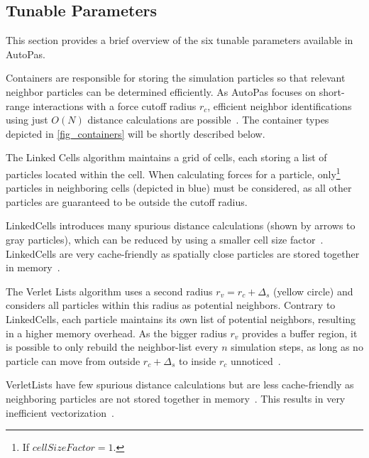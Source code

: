 \documentclass[conference]{IEEEtran}
\begin{document}
\subsection{Tunable Parameters}

This section provides a brief overview of the six tunable parameters available in AutoPas.

\begin{description}[style=nextline]
    \item[Container]
        Containers are responsible for storing the simulation particles so that relevant neighbor particles can be determined efficiently. As AutoPas focuses on short-range interactions with a force cutoff radius $r_c$, efficient neighbor identifications using just $O(N)$ distance calculations are possible~\cite{Gratl2019AutoPas}. The container types depicted in \autoref{fig_containers} will be shortly described below.

        \begin{description}[style=nextline, font=\itshape]
            \item[$\bullet$ Linked Cells]
                The Linked Cells algorithm maintains a grid of cells, each storing a list of particles located within the cell. When calculating forces for a particle, only\footnote{If $cellSizeFactor = 1$.} particles in neighboring cells (depicted in blue) must be considered, as all other particles are guaranteed to be outside the cutoff radius.

                LinkedCells introduces many spurious distance calculations (shown by arrows to gray particles), which can be reduced by using a smaller cell size factor~\cite{menges2019}. LinkedCells are very cache-friendly as spatially close particles are stored together in memory~\cite{Gratl2022AutoPas}.

            \item[$\bullet$ Verlet Lists]
                The Verlet Lists algorithm uses a second radius $r_v = {r_c} + \Delta_s$ (yellow circle) and considers all particles within this radius as potential neighbors. Contrary to LinkedCells, each particle maintains its own list of potential neighbors, resulting in a higher memory overhead.
                As the bigger radius $r_v$ provides a buffer region, it is possible to only rebuild the neighbor-list every $n$ simulation steps, as long as no particle can move from outside $r_c + \Delta_s$ to inside $r_c$ unnoticed~\cite{NEWCOME2023115278}.

                VerletLists have few spurious distance calculations but are less cache-friendly as neighboring particles are not stored together in memory~\cite{Gratl2022AutoPas}. This results in very inefficient vectorization~\cite{PALL20132641}.


\end{description}
\end{description}
\end{document}
